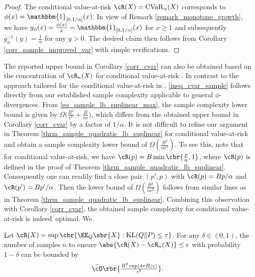 \documentclass[9pt]{article} %
\numberwithin{equation}{section}
\renewcommand{\frac}[2]{\tfrac{#1}{#2}}
\begin{document}
\begin{proof}
The conditional value-at-risk $\cR(X) = \mathrm{CVaR}_\alpha(X)$ corresponds to $\phi(x) = \mathbbm{1}_{[0, 1/\alpha]}(x)$. 
In view of Remark \ref{remark_monotone_growth}, we have 
$g_\phi(x) = \frac{\phi(x) }{x} = \mathbbm{1}_{[0, 1/\alpha]}(x)$ for $x \geq 1$ and subsequently $g_\phi^{-1}(y) = \frac{1}{\alpha}$ for any $y > 0$. 
The desired claim then follows from  Corollary \ref{corr_sample_improved_var} with simple verifications. 
\end{proof}

The reported upper bound in Corollary \ref{corr_cvar} can also be obtained based on the concentration of $\cR_n(X)$ for conditional value-at-risk \cite{wang2010deviation}.
In contrast to  the approach tailored for the conditional value-at-risk in \cite{wang2010deviation}, \eqref{ineq_cvar_sample} follows directly from our established sample complexity applicable to general $\phi$-divergences. 
From \eqref{eq_sample_lb_suplinear_max}, the sample complexity lower bound is given by 
$
\Omega \big( {
 \frac{B^2}{\epsilon^2} + \frac{ B }{  \alpha \epsilon  }
} \big)
$,
which differs from the obtained upper bound in Corollary \ref{corr_cvar} by a factor of ${1}/{\alpha}$. 
It is not difficult to refine our argument in Theorem \ref{thrm_sample_quadratic_lb_suplinear} for conditional value-at-risk and obtain a sample complexity lower bound of 
$
\Omega( \frac{B^2}{\alpha \epsilon^2})$.
To see this, note that for conditional value-at-risk, we have $\cR(p) = B \min \cbr{\frac{p}{\alpha}, 1}$, where $\cR(p)$ is defined in the proof of 
Theorem \ref{thrm_sample_quadratic_lb_suplinear}.
Consequently one can readily find a close pair $(p', p)$ with $\cR(p) = B p /\alpha$ and $\cR(p') = B p'/\alpha$. 
Then the lower bound of $\Omega( \frac{B^2}{\alpha \epsilon^2})$ follows from similar lines as in Theorem \ref{thrm_sample_quadratic_lb_suplinear}.
Combining this observation with Corollary \ref{corr_cvar}, the obtained sample complexity for conditional value-at-risk is indeed~optimal.
We 




\begin{corollary}\label{corr_kl}
Let $\cR(X) = \sup \cbr{\EE_Q \sbr{X}: \mathrm{KL}(Q \Vert P) \leq \tau}$. 
For any $\delta \in (0,1)$, the number of samples $n$ to ensure $\abs{\cR(X) - \cR_n(X)} \leq \epsilon$ with probability $1-\delta$ can be bounded by 
\begin{align*}
\tilde{\cO} \rbr{
\frac{B^2 \exp(4\tau B/\epsilon)}{\epsilon^2}
}.
\end{align*}
\end{corollary}
\end{document}
